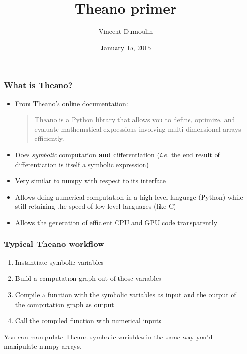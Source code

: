 \documentclass[mathserif, xcolor=dvipsnames]{beamer}
\title{Theano primer}
\author{Vincent Dumoulin}
\date{January 15, 2015}
\begin{document}
\begin{frame}[plain]
    \titlepage
\end{frame}

\begin{frame}
    \frametitle{What is Theano?}
    \begin{itemize}
    \item{From Theano's online documentation:
        \begin{quote}
            Theano is a Python library that allows you to define, optimize,
            and evaluate mathematical expressions involving multi-dimensional
            arrays efficiently.
        \end{quote}}
    \item{Does \emph{symbolic} computation \textbf{and} differentiation
          (\emph{i.e.} the end result of differentiation is itself a symbolic
          expression)}
    \item{Very similar to numpy with respect to its interface}
    \item{Allows doing numerical computation in a high-level language (Python)
          while still retaining the speed of low-level languages (like C)}
    \item{Allows the generation of efficient CPU and GPU code transparently}
    \end{itemize}
\end{frame}

\begin{frame}
    \frametitle{Typical Theano workflow}
    \begin{enumerate}\addtolength{\itemsep}{1.0\baselineskip}
        \item{Instantiate symbolic variables}
        \item{Build a computation graph out of those variables}
        \item{Compile a function with the symbolic variables as input and the
              output of the computation graph as output}
        \item{Call the compiled function with numerical inputs}
    \end{enumerate}

    You can manipulate Theano symbolic variables in the same way you'd
    manipulate numpy arrays.
\end{frame}
\end{document}
